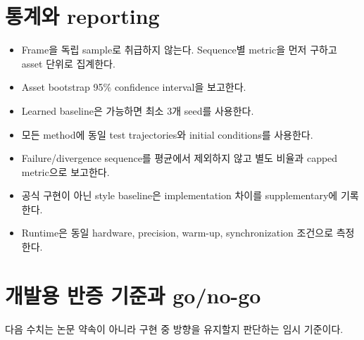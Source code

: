 \documentclass[11pt,a4paper]{article}
\begin{document}
\section{통계와 reporting}

\begin{itemize}[leftmargin=1.5em]
  \item Frame을 독립 sample로 취급하지 않는다.
  Sequence별 metric을 먼저 구하고 asset 단위로 집계한다.
  \item Asset bootstrap 95\% confidence interval을 보고한다.
  \item Learned baseline은 가능하면 최소 3개 seed를 사용한다.
  \item 모든 method에 동일 test trajectories와 initial conditions를 사용한다.
  \item Failure/divergence sequence를 평균에서 제외하지 않고 별도 비율과 capped metric으로 보고한다.
  \item 공식 구현이 아닌 style baseline은 implementation 차이를 supplementary에 기록한다.
  \item Runtime은 동일 hardware, precision, warm-up, synchronization 조건으로 측정한다.
\end{itemize}

\section{개발용 반증 기준과 go/no-go}

다음 수치는 논문 약속이 아니라 구현 중 방향을 유지할지 판단하는 임시 기준이다.
\end{document}
